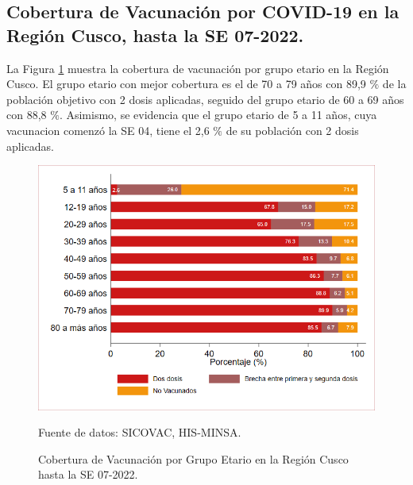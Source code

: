 \documentclass[12pt,a4paper,openany]{book}
\begin{document}
	\subsection*{Cobertura de Vacunación por COVID-19 en la Región Cusco, hasta la SE 07-2022.}
\noindent La Figura \ref{fig:vacuna_edad} muestra la cobertura de vacunación por grupo etario en la Región Cusco. El grupo etario con mejor cobertura es el de 70 a 79 años con 89,9 $\%$ de la población objetivo con 2 dosis aplicadas, seguido del grupo etario de 60 a 69 años con 88,8 $\%$. Asimismo, se evidencia que el grupo etario de 5 a 11 años, cuya vacunacion comenzó la SE 04, tiene el 2,6 $\%$ de su población con 2 dosis aplicadas.  

\begin{figure}[h]
	\caption{Cobertura de Vacunación por Grupo Etario en la Región Cusco hasta la SE 07-2022. }\label{fig:vacuna_edad}
	\begin{center}
		\includegraphics[width=0.90\linewidth]{../figuras/vacunacion_grupo_edad.png}
	\end{center}
	{\footnotesize {Fuente de datos: SICOVAC, HIS-MINSA.}}
\end{figure}
\end{document}
